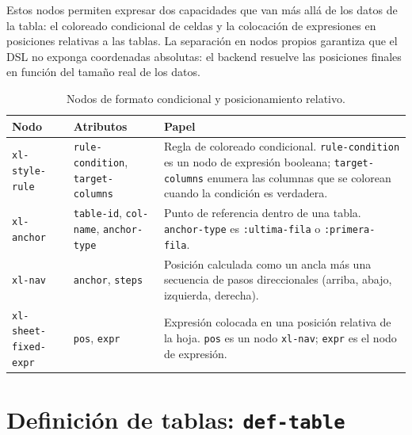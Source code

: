 \documentclass[12pt,a4paper]{report}
\begin{document}
Estos nodos permiten expresar dos capacidades que van m\'as all\'a de los
datos de la tabla: el coloreado condicional de celdas y la colocaci\'on de
expresiones en posiciones relativas a las tablas.  La separaci\'on en nodos
propios garantiza que el DSL no exponga coordenadas absolutas: el backend
resuelve las posiciones finales en funci\'on del tama\~no real de los datos.

\begin{table}[h!]
\centering
\caption{Nodos de formato condicional y posicionamiento relativo.}
\label{tab:ast-formato}
\renewcommand{\arraystretch}{1.3}
\begin{tabular}{p{3.6cm} p{4.8cm} p{5.4cm}}
\hline
\textbf{Nodo} & \textbf{Atributos} & \textbf{Papel} \\
\hline
\texttt{xl-style-rule}
  & \texttt{rule-condition},\newline
    \texttt{target-columns}
  & Regla de coloreado condicional.  \texttt{rule-condition}
    es un nodo de expresi\'on booleana; \texttt{target-columns}
    enumera las columnas que se colorean cuando la condici\'on
    es verdadera. \\
\hline
\texttt{xl-anchor}
  & \texttt{table-id},\newline
    \texttt{col-name},\newline
    \texttt{anchor-type}
  & Punto de referencia dentro de una tabla.
    \texttt{anchor-type} es \texttt{:ultima-fila} o
    \texttt{:primera-fila}. \\
\hline
\texttt{xl-nav}
  & \texttt{anchor}, \texttt{steps}
  & Posici\'on calculada como un ancla m\'as una secuencia de
    pasos direccionales (arriba, abajo, izquierda, derecha). \\
\hline
\texttt{xl-sheet-fixed-expr}
  & \texttt{pos}, \texttt{expr}
  & Expresi\'on colocada en una posici\'on relativa de la hoja.
    \texttt{pos} es un nodo \texttt{xl-nav}; \texttt{expr} es
    el nodo de expresi\'on. \\
\hline
\end{tabular}
\end{table}

\section{Definici\'on de tablas: \texttt{def-table}}
\label{sec:def-table}
\end{document}
